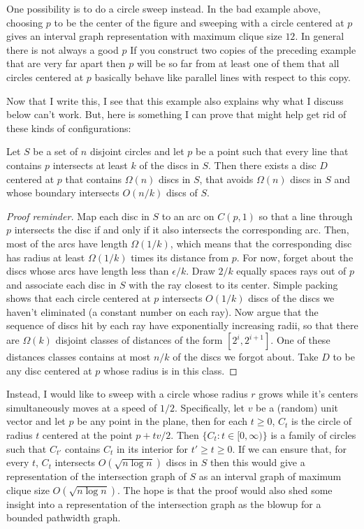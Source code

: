 \documentclass{patmorin}
\renewcommand{\ge}{\geqslant}
\begin{document}
One possibility is to do a circle sweep instead. In the bad example above, choosing $p$ to be the center of the figure and sweeping with a circle centered at $p$ gives an interval graph representation with maximum clique size $12$.  In general there is not always a good $p$  If you construct two copies of the preceding example that are very far apart then $p$ will be so far from at least one of them that all circles centered at $p$ basically behave like parallel lines with respect to this copy.

Now that I write this, I see that this example also explains why what I discuss below can't work.  But, here is something I can prove that might help get rid of these kinds of configurations:

\begin{lem}
  Let $S$ be a set of $n$ disjoint circles and let $p$ be a point such that every line that contains $p$ intersects at least $k$ of the discs in $S$.  Then there exists a disc $D$ centered at $p$ that contains $\Omega(n)$ discs in $S$, that avoids $\Omega(n)$ discs in $S$ and whose boundary intersects $O(n/k)$ discs of $S$.
\end{lem}

\begin{proof}[Proof reminder]
  Map each disc in $S$ to an arc on $C(p,1)$ so that a line through $p$ intersects the disc if and only if it also intersects the corresponding arc.  Then, most of the arcs have length $\Omega(1/k)$, which means that the corresponding disc has radius at least $\Omega(1/k)$ times its distance from $p$.  For now, forget about the discs whose arcs have length less than $\epsilon/ k$.  Draw $2/k$ equally spaces rays out of $p$ and associate each disc in $S$ with the ray closest to its center.  Simple packing shows that each circle centered at $p$ intersects $O(1/k)$ discs of the discs we haven't eliminated (a constant number on each ray).  Now argue that the sequence of discs hit by each ray have exponentially increasing radii, so that there are  $\Omega(k)$ disjoint classes of distances of the form $[2^i,2^{i+1}]$.  One of these distances classes contains at most $n/k$ of the discs we forgot about.  Take $D$ to be any disc centered at $p$ whose radius is in this class.
\end{proof}

Instead, I would like to sweep with a circle whose radius $r$ grows while it's centers simultaneously moves at a speed of $1/2$.  Specifically, let $v$ be a (random) unit vector and let $p$ be any point in the plane, then for each $t\ge 0$, $C_t$ is the circle of radius $t$ centered at the point $p+tv/2$. Then $\{C_t: t\in[0,\infty)\}$ is a family of circles such that $C_{t'}$ contains $C_t$ in its interior for $t'\ge t\ge 0$.  If we can ensure that, for every $t$, $C_t$ intersects $O(\sqrt{n\log n})$ discs in $S$ then this would give a representation of the intersection graph of $S$ as an interval graph of maximum clique size $O(\sqrt{n\log n})$.  The hope is that the proof would also shed some insight into a representation of the intersection graph as the blowup for a bounded pathwidth graph.
\end{document}
